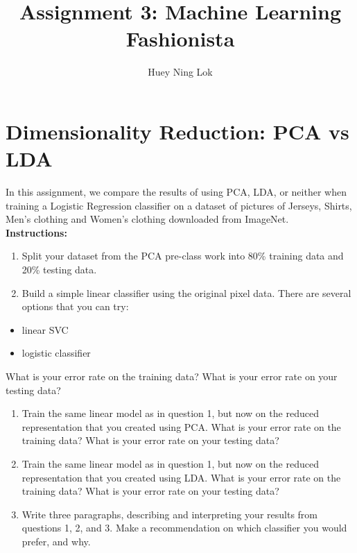 \documentclass[11pt]{article}
\title{Assignment 3: Machine Learning Fashionista}
\author{Huey Ning Lok}
\providecommand{\tightlist}{%
      \setlength{\itemsep}{0pt}\setlength{\parskip}{0pt}}
\begin{document}
    
    
    \maketitle
   

\section*{Dimensionality Reduction: PCA vs LDA}

In this assignment, we compare the results of using PCA, LDA, or neither
when training a Logistic Regression classifier on a dataset of pictures
of Jerseys, Shirts, Men's clothing and Women's clothing downloaded from
ImageNet.\\

\textbf{Instructions:}

\begin{enumerate}
\def\labelenumi{\arabic{enumi})}
\item
  Split your dataset from the PCA pre-class work into 80\% training data
  and 20\% testing data.
\item
  Build a simple linear classifier using the original pixel data. There
  are several options that you can try:
\end{enumerate}

\begin{itemize}
\tightlist
\item
  linear SVC\\

\item
  logistic classifier
\end{itemize}

What is your error rate on the training data? What is your error rate on
your testing data?

\begin{enumerate}
\def\labelenumi{\arabic{enumi})}
\setcounter{enumi}{2}
\item
  Train the same linear model as in question 1, but now on the reduced
  representation that you created using PCA. What is your error rate on
  the training data? What is your error rate on your testing data?
\item
  Train the same linear model as in question 1, but now on the reduced
  representation that you created using LDA. What is your error rate on
  the training data? What is your error rate on your testing data?
\item
  Write three paragraphs, describing and interpreting your results from
  questions 1, 2, and 3. Make a recommendation on which classifier you
  would prefer, and why.
\end{enumerate}
\newpage
\end{document}
